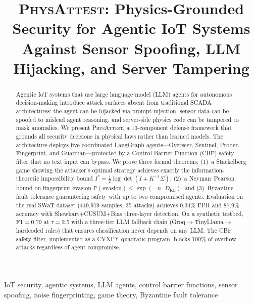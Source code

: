 \documentclass[journal]{IEEEtran}
\newcommand{\physattest}{\textsc{PhysAttest}}
\newcommand{\Prob}{\mathbb{P}}
\newcommand{\KL}{D_{\mathrm{KL}}}
\begin{document}
\title{\physattest: Physics-Grounded Security for Agentic IoT Systems Against Sensor Spoofing, LLM Hijacking, and Server Tampering}

\author{
}

\maketitle

\begin{abstract}
Agentic IoT systems that use large language model (LLM) agents for autonomous decision-making introduce attack surfaces absent from traditional SCADA architectures: the agent can be hijacked via prompt injection, sensor data can be spoofed to mislead agent reasoning, and server-side physics code can be tampered to mask anomalies. We present \physattest{}, a 13-component defense framework that grounds all security decisions in physical laws rather than learned models. The architecture deploys five coordinated LangGraph agents---Overseer, Sentinel, Prober, Fingerprint, and Guardian---protected by a Control Barrier Function (CBF) safety filter that no text input can bypass. We prove three formal theorems: (1)~a Stackelberg game showing the attacker's optimal strategy achieves exactly the information-theoretic impossibility bound $I^* = \frac{1}{2}\log\det(I + K^{-1}\Sigma)$; (2)~a Neyman--Pearson bound on fingerprint evasion $\Prob(\text{evasion}) \le \exp(-n \cdot \KL)$; and (3)~Byzantine fault tolerance guaranteeing safety with up to two compromised agents. Evaluation on the real SWaT dataset (449{,}919 samples, 35 attacks) achieves 0.34\% FPR and 87.9\% accuracy with Shewhart+CUSUM+Bias three-layer detection. On a synthetic testbed, F1$=$0.79 at $\tau{=}2.5$ with a three-tier LLM fallback chain (Groq$\to$TinyLlama$\to$hardcoded rules) that ensures classification never depends on any LLM. The CBF safety filter, implemented as a CVXPY quadratic program, blocks 100\% of overflow attacks regardless of agent compromise.
\end{abstract}

\begin{IEEEkeywords}
IoT security, agentic systems, LLM agents, control barrier functions, sensor spoofing, noise fingerprinting, game theory, Byzantine fault tolerance
\end{IEEEkeywords}
\end{document}
